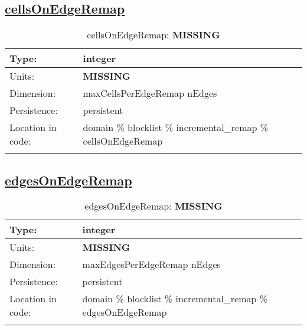 \subsection[cellsOnEdgeRemap]{\hyperref[sec:var_tab_incremental_remap]{cellsOnEdgeRemap}}
\label{subsec:var_sec_incremental_remap_cellsOnEdgeRemap}
\begin{center}
\begin{longtable}{| p{2.0in} | p{4.0in} |}
        \hline 
        Type: & integer \\
        \hline 
        Units: & {\bf \color{red} MISSING} \\
        \hline 
        Dimension: & maxCellsPerEdgeRemap nEdges \\
        \hline 
        Persistence: & persistent \\
        \hline 
         Location in code: & domain \% blocklist \% incremental\_remap \% cellsOnEdgeRemap \\
         \hline 
    \caption{cellsOnEdgeRemap: {\bf \color{red} MISSING}}
\end{longtable}
\end{center}
\subsection[edgesOnEdgeRemap]{\hyperref[sec:var_tab_incremental_remap]{edgesOnEdgeRemap}}
\label{subsec:var_sec_incremental_remap_edgesOnEdgeRemap}
\begin{center}
\begin{longtable}{| p{2.0in} | p{4.0in} |}
        \hline 
        Type: & integer \\
        \hline 
        Units: & {\bf \color{red} MISSING} \\
        \hline 
        Dimension: & maxEdgesPerEdgeRemap nEdges \\
        \hline 
        Persistence: & persistent \\
        \hline 
         Location in code: & domain \% blocklist \% incremental\_remap \% edgesOnEdgeRemap \\
         \hline 
    \caption{edgesOnEdgeRemap: {\bf \color{red} MISSING}}
\end{longtable}
\end{center}
